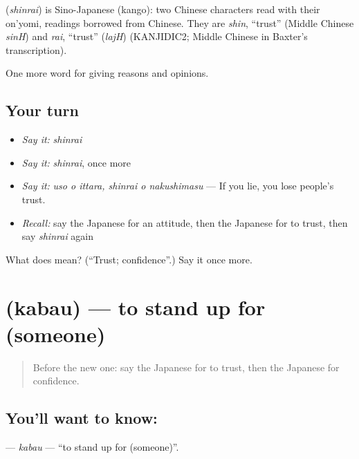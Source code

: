 \begin{cousinweb}
\textbf{} (\emph{shinrai}) is Sino-Japanese (kango): two Chinese characters read with their on'yomi, readings borrowed from Chinese. They are \emph{shin}, \textquotedblleft{}trust\textquotedblright{} (Middle Chinese \emph{sinH}) and \emph{rai}, \textquotedblleft{}trust\textquotedblright{} (\emph{lajH}) (KANJIDIC2; Middle Chinese in Baxter's transcription).
\end{cousinweb}

\begin{grammarlens}[title={What you've built}]
One more word for giving reasons and opinions.
\end{grammarlens}

\subsection*{Your turn}
\begin{itemize}
\raggedright
  \item \emph{Say it:} \emph{shinrai}
  \item \emph{Say it:} \emph{shinrai}, once more
  \item \emph{Say it:} \emph{uso o ittara, shinrai o nakushimasu} — If you lie, you lose people's trust.
  \item \emph{Recall:} say the Japanese for an attitude, then the Japanese for to trust, then say \emph{shinrai} again
\end{itemize}

\begin{tcolorbox}[breakable,colback=teal!4,colframe=teal!35!black,title={Before you move on}]
What does  mean? (\textquotedblleft{}Trust; confidence\textquotedblright{}.) Say it once more.
\end{tcolorbox}
\section[\texorpdfstring{\ja{かばう} (kabau)}{かばう (kabau)}]{ (kabau) — to stand up for (someone)}

\label{lesson:JA-C343-kabau}



\begin{quote}
Before the new one: say the Japanese for to trust, then the Japanese for confidence.
\end{quote}

\subsection*{You'll want to know: }
\textbf{} — \emph{kabau} — \textquotedblleft{}to stand up for (someone)\textquotedblright{}.

